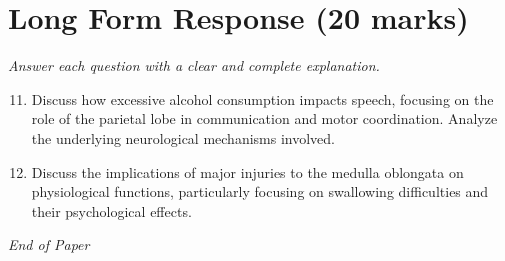 \documentclass[12pt]{article}
\begin{document}
\section*{Long Form Response (20 marks)}
\textit{Answer each question with a clear and complete explanation.}
\begin{enumerate}[label=\arabic*.]
\setcounter{enumi}{10}
\item Discuss how excessive alcohol consumption impacts speech, focusing on the role of the parietal lobe in communication and motor coordination. Analyze the underlying neurological mechanisms involved.
\item Discuss the implications of major injuries to the medulla oblongata on physiological functions, particularly focusing on swallowing difficulties and their psychological effects.
\end{enumerate}

\vfill
\noindent\textit{End of Paper}
\end{document}
